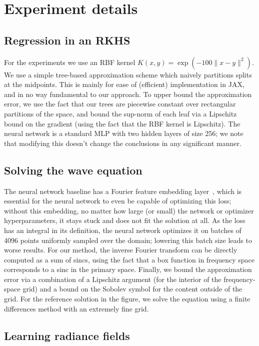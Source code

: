 \documentclass{article}
\begin{document}
\section{Experiment details}

\subsection{Regression in an RKHS}

For the experiments we use an RBF kernel $K(x, y) = \exp(-100 \lVert x - y \rVert^2)$.
We use a simple tree-based approximation scheme which naively partitions splits at the midpoints.
This is mainly for ease of (efficient) implementation in JAX, and in no way fundamental to our approach.
To upper bound the approximation error, we use the fact that our trees are piecewise constant over rectangular partitions of the space, and bound the sup-norm of each leaf via a Lipschitz bound on the gradient (using the fact that the RBF kernel is Lipschitz).
The neural network is a standard MLP with two hidden layers of size 256; we note that modifying this doesn't change the conclusions in any significant manner.

\subsection{Solving the wave equation}

The neural network baseline has a Fourier feature embedding layer~\citep{fourier-embedding}, which is essential for the neural network to even be capable of optimizing this loss; without this embedding, no matter how large (or small) the network or optimizer hyperparameters, it stays stuck and does not fit the solution at all.
As the loss has an integral in its definition, the neural network optimizes it on batches of 4096 points uniformly sampled over the domain; lowering this batch size leads to worse results.
For our method, the inverse Fourier transform can be directly computed as a sum of sincs, using the fact that a box function in frequency space corresponds to a sinc in the primary space.
Finally, we bound the approximation error via a combination of a Lipschitz argument (for the interior of the frequency-space grid) and a bound on the Sobolev symbol for the content outside of the grid.
For the reference solution in the figure, we solve the equation using a finite differences method with an extremely fine grid.

\subsection{Learning radiance fields}
\end{document}
